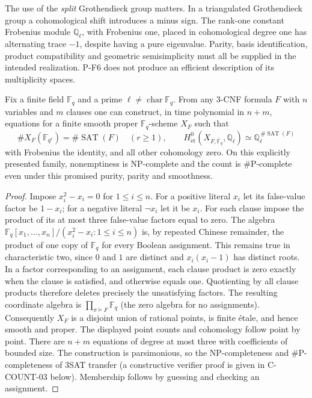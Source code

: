 The use of the \emph{split} Grothendieck group matters. In a triangulated
Grothendieck group a cohomological shift introduces a minus sign.
The rank-one constant Frobenius module $\mathbb Q_\ell$, with Frobenius
one, placed in cohomological degree one has alternating trace $-1$,
despite having a pure eigenvalue. Parity, basis identification, product
compatibility and geometric semisimplicity must all be supplied in the
intended realization. P-F6 does not produce an efficient description of
its multiplicity spaces.

\begin{proposition}
\label{prop:tatesat}
Fix a finite field $\mathbb F_q$ and a prime $\ell\ne\operatorname{char}\mathbb F_q$.
From any 3-CNF formula $F$ with $n$
variables and $m$ clauses one can construct, in time polynomial in
$n+m$, equations for a finite smooth proper $\mathbb F_q$-scheme $X_F$
such that
\[
 \#X_F(\mathbb F_{q^r})=\#\operatorname{SAT}(F)\quad(r\ge1),\qquad
 H^0_{\mathrm{\acute et}}(X_{F,\overline{\mathbb F}_q},\mathbb Q_\ell)
 \simeq \mathbb Q_\ell^{\,\#\operatorname{SAT}(F)}
\]
with Frobenius the identity, and all other cohomology zero.
On this explicitly presented family, nonemptiness is NP-complete and
the count is \#P-complete even under this promised purity, parity and
smoothness.
\end{proposition}
\begin{proof}
Impose $x_i^2-x_i=0$ for $1\le i\le n$.
For a positive literal $x_i$ let its false-value factor be $1-x_i$;
for a negative literal $\neg x_i$ let it be $x_i$.
For each clause impose the product of its at most three false-value
factors equal to zero.
The algebra
$\mathbb F_q[x_1,\ldots,x_n]/(x_i^2-x_i:1\le i\le n)$
is, by repeated Chinese remainder, the product of one copy of
$\mathbb F_q$ for every Boolean assignment. This remains true in
characteristic two, since $0$ and $1$ are distinct and
$x_i(x_i-1)$ has distinct roots.
In a factor corresponding to an assignment, each clause product is
zero exactly when the clause is satisfied, and otherwise equals one.
Quotienting by all clause products therefore deletes precisely the
unsatisfying factors. The resulting coordinate algebra is
$\prod_{\sigma\models F}\mathbb F_q$ (the zero algebra for no assignments).
Consequently $X_F$ is a disjoint union of rational points, is finite
\'etale, and hence smooth and proper. The displayed point counts and
cohomology follow point by point.
There are $n+m$ equations of degree at most three with coefficients of
bounded size. The construction is parsimonious, so the
NP-completeness and \#P-completeness of 3SAT transfer (a constructive
verifier proof is given in C-COUNT-03 below). Membership follows
by guessing and checking an assignment.
\end{proof}

